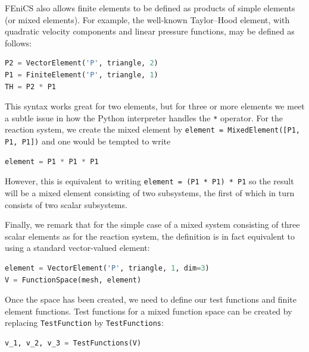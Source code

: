 \documentclass[graybox,envcountchap,sectrefs,final]{svmonodo}
\newenvironment{warning_mdfboxadmon}[1][]{
\begin{warning_mdfboxmdframed}[frametitle=#1]
}
{
\end{warning_mdfboxmdframed}
}
\begin{document}
\begin{warning_mdfboxadmon}
FEniCS also allows finite elements to be defined as products of simple
elements (or mixed elements). For example, the well-known Taylor--Hood
element, with quadratic velocity components and linear pressure functions,
may be defined as follows:

\begin{lstlisting}[language=Python,style=graycolor]
P2 = VectorElement('P', triangle, 2)
P1 = FiniteElement('P', triangle, 1)
TH = P2 * P1
\end{lstlisting}
This syntax works great for two elements, but for three or more
elements we meet a subtle issue in how the Python interpreter handles
the \texttt{*} operator. For the reaction system, we create the mixed element
by \texttt{element = MixedElement([P1, P1, P1])} and one would be tempted to
write

\begin{lstlisting}[language=Python,style=graycolor]
element = P1 * P1 * P1
\end{lstlisting}
However, this is equivalent to writing \texttt{element = (P1 * P1) * P1} so
the result will be a mixed element consisting of two subsystems, the
first of which in turn consists of two scalar subsystems.

Finally, we remark that for the simple case of a mixed system
consisting of three scalar elements as for the reaction system, the
definition is in fact equivalent to using a standard vector-valued
element:


\begin{lstlisting}[language=Python,style=graycolor]
element = VectorElement('P', triangle, 1, dim=3)
V = FunctionSpace(mesh, element)
\end{lstlisting}
\end{warning_mdfboxadmon} %



Once the space has been created, we need to define our test functions
and finite element functions. Test functions for a mixed function
space can be created by replacing \texttt{TestFunction} by \texttt{TestFunctions}:

\begin{lstlisting}[language=Python,style=graycolor]
v_1, v_2, v_3 = TestFunctions(V)
\end{lstlisting}
\end{document}
